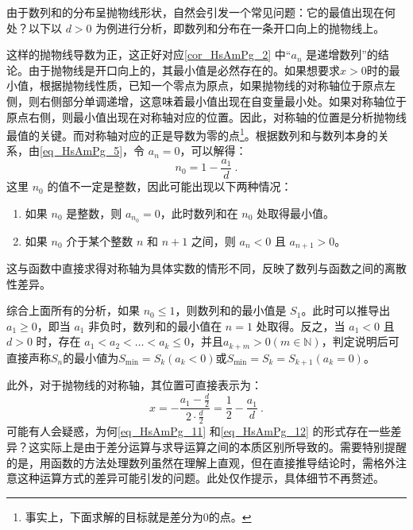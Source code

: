 由于数列和的分布呈抛物线形状，自然会引发一个常见问题：它的最值出现在何处？以下以 $d > 0$ 为例进行分析，即数列和分布在一条开口向上的抛物线上。

这样的抛物线导数为正，这正好对应\autoref{cor_HsAmPg_2} 中“${a_n}$ 是递增数列”的结论。由于抛物线是开口向上的，其最小值是必然存在的。如果想要求$x>0$时的最小值，根据抛物线性质，已知一个零点为原点，如果抛物线的对称轴位于原点左侧，则右侧部分单调递增，这意味着最小值出现在自变量最小处。如果对称轴位于原点右侧，则最小值出现在对称轴对应的位置。因此，对称轴的位置是分析抛物线最值的关键。而对称轴对应的正是导数为零的点\footnote{事实上，下面求解的目标就是差分为0的点。}。根据数列和与数列本身的关系，由\autoref{eq_HsAmPg_5}，令 $a_n = 0$，可以解得：
\begin{equation}\label{eq_HsAmPg_11}
n_0=1-\frac{a_1}{d}~.
\end{equation}
这里 $n_0$ 的值不一定是整数，因此可能出现以下两种情况：
\begin{enumerate}
\item 如果 $n_0$ 是整数，则 $a_{n_0} = 0$，此时数列和在 $n_0$ 处取得最小值。
\item 如果 $n_0$ 介于某个整数 $n$ 和 $n+1$ 之间，则 $a_n < 0$ 且 $a_{n+1} > 0$。
\end{enumerate}
这与函数中直接求得对称轴为具体实数的情形不同，反映了数列与函数之间的离散性差异。

综合上面所有的分析，如果 $n_0 \leq 1$，则数列和的最小值是 $S_1$。此时可以推导出 $a_1 \geq 0$，即当 $a_1$ 非负时，数列和的最小值在 $n=1$ 处取得。反之，当 $a_1 < 0$ 且 $d > 0$ 时，存在 $a_1 < a_2 < \dots < a_k \leq 0$，并且$a_{k+m}>0(m\in\mathbb{N})$，判定说明后可直接声称$S_n$的最小値为$S_{\min}=S_k(a_k < 0)$或$S_{\min}=S_k=S_{k+1}(a_k=0)$。

此外，对于抛物线的对称轴，其位置可直接表示为：
\begin{equation}\label{eq_HsAmPg_12}
x=-\frac{a_1-\frac{d}{2}}{2\cdot\frac{d}{2}}=\frac{1}{2}-\frac{a_1}{d}~.
\end{equation}
可能有人会疑惑，为何\autoref{eq_HsAmPg_11} 和\autoref{eq_HsAmPg_12} 的形式存在一些差异？这实际上是由于差分运算与求导运算之间的本质区别所导致的。需要特别提醒的是，用函数的方法处理数列虽然在理解上直观，但在直接推导结论时，需格外注意这种运算方式的差异可能引发的问题。此处仅作提示，具体细节不再赘述。